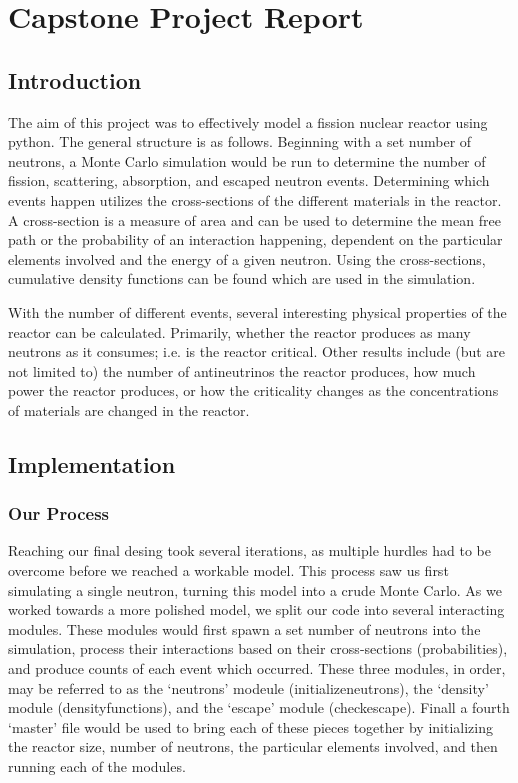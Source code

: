 \documentclass{notes}
\begin{document}
\section*{Capstone Project Report}

\subsection*{Introduction}

The aim of this project was to effectively model a fission nuclear reactor using python. The general structure is as follows. Beginning with a set number of neutrons, a Monte Carlo simulation would be run to determine the number of fission, scattering, absorption, and escaped neutron events. Determining which events happen utilizes the cross-sections of the different materials in the reactor. A cross-section is a measure of area and can be used to determine the mean free path or the probability of an interaction happening, dependent on the particular elements involved and the energy of a given neutron. Using the cross-sections, cumulative density functions can be found which are used in the simulation. 

With the number of different events, several interesting physical properties of the reactor can be calculated. Primarily, whether the reactor produces as many neutrons as it consumes; i.e. is the reactor critical. Other results include (but are not limited to) the number of antineutrinos the reactor produces, how much power the reactor produces, or how the criticality changes as the concentrations of materials are changed in the reactor.

\subsection*{Implementation}

\subsubsection*{Our Process}

Reaching our final desing took several iterations, as multiple hurdles had to be overcome before we reached a workable model. This process saw us first simulating a single neutron, turning this model into a crude Monte Carlo. As we worked towards a more polished model, we split our code into several interacting modules. These modules would first spawn a set number of neutrons into the simulation, process their interactions based on their cross-sections (probabilities), and produce counts of each event which occurred. These three modules, in order, may be referred to as the `neutrons' modeule (initialize\textunderscore neutrons), the `density' module (density\textunderscore functions), and the `escape' module (check\textunderscore escape). Finall a fourth `master' file would be used to bring each of these pieces together by initializing the reactor size, number of neutrons, the particular elements involved, and then running each of the modules.

\nocite{*}


\end{document}
